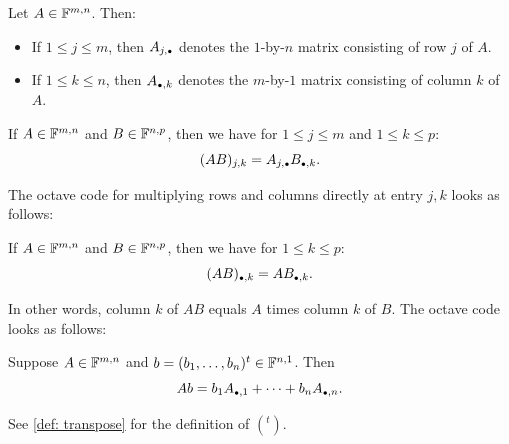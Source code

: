 \begin{mydef}  Let $A\in \mathbb{F}^{m,n}$. Then:
  \begin{itemize}
    \item If $1 \leq j \leq m$, then $A_{j, \mathsmaller{\bullet}}$ denotes the $1$-by-$n$ matrix consisting of row $j$ of $A$.
    \item If $1 \leq k \leq n$, then $A_{\mathsmaller{\bullet}, k}$ denotes the $m$-by-$1$ matrix consisting of column $k$ of $A$.
  \end{itemize}
\end{mydef}

\setcounter{thm}{45}
\begin{thm} 
  If $A \in \mathbb{F}^{m,n}$ and $B \in \mathbb{F}^{n,p}$, then we have for $1 \leq j \leq m$ and $1 \leq k \leq p$:
  \begin{equation}
    (AB)_{j,k} = A_{j, \mathsmaller{\bullet}} B_{\mathsmaller{\bullet}, k}.
  \end{equation}


    The octave code for multiplying rows and columns directly at entry $j,k$ looks as follows:


\end{thm}

\setcounter{thm}{47}
\begin{thm}
  If $A \in \mathbb{F}^{m,n}$ and $B \in \mathbb{F}^{n,p}$, then we have for $1 \leq k \leq p$:
  \begin{equation}
    (AB)_{\mathsmaller{\bullet}, k} = AB_{\mathsmaller{\bullet}, k}.
  \end{equation}

  In other words, column $k$ of $AB$ equals $A$ times column $k$ of $B$. The octave code looks as follows:


\end{thm}

\setcounter{thm}{49}
\begin{thm} 
  \label{thm: linear combination of columns}
  Suppose $A \in \mathbb{F}^{m,n}$ and $b = (b_1, \ldots, b_n)^{t}\in \mathbb{F}^{n,1}$. Then
  \begin{equation}
    Ab = b_1 A_{\mathsmaller{\bullet}, 1} + \dots + b_n A_{\mathsmaller{\bullet},n}.
  \end{equation}

  See \ref{def: transpose} for the definition of $(^t)$.
\end{thm}

